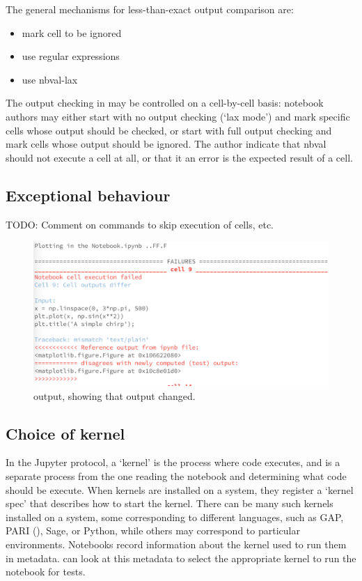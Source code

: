 \documentclass{deliverablereport}
\begin{document}
The general mechanisms for less-than-exact output comparison are:

\begin{itemize}
\item mark cell to be ignored
\item use regular expressions
\item use nbval-lax
\end{itemize}

The output checking in \nbval may be controlled on a cell-by-cell
basis: notebook authors may either start with no output checking (`lax
mode') and mark specific cells whose output should be checked, or
start with full output checking and mark cells whose output should be
ignored.  The author indicate that nbval should not execute a cell at
all, or that it an error is the expected result of a cell.

\subsection{Exceptional behaviour}
TODO: Comment on commands to skip execution of cells, etc.
\begin{figure}[ht]
  \centering
  \includegraphics[width=.7\textwidth]{img/nbval-terminal}
  \caption{\nbval output, showing that output changed.}\label{fig:nbval}
\end{figure}

\subsection{Choice of kernel}

In the Jupyter protocol, a `kernel' is the process where code executes,
and is a separate process from the one reading the notebook and determining what code should be execute.
When kernels are installed on a system,
they register a `kernel spec' that describes how to start the kernel.
There can be many such kernels installed on a system,
some corresponding to different languages, such as GAP, PARI (), Sage, or Python,
while others may correspond to particular environments.
Notebooks record information about the kernel used to run them in metadata.
\nbval can look at this metadata to select the appropriate kernel to run the notebook for tests.
\end{document}

